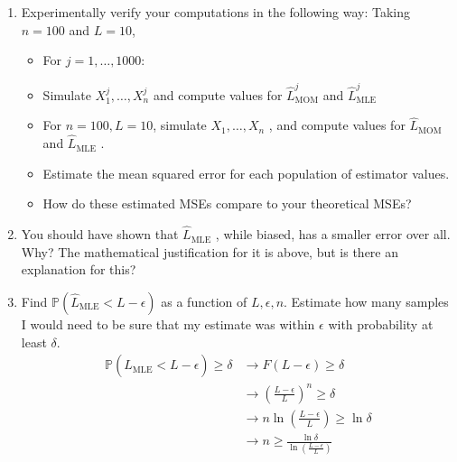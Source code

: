 \documentclass[letter, 12pt]{article}
\begin{document}
\begin{enumerate}[wide = 0pt, label = \arabic*)]
		\item {Experimentally verify your computations in the following way: Taking $ n = 100 $ and $ L = 10 $,}
		\begin{itemize}
			\item {For $ j = 1, \dots , 1000 $:}
			\item {Simulate $ X_1^j , \dots , X_n^j $ and compute values for $ \hat{L}_{\text{MOM}}^j $ and $ \hat{L}_{\text{MLE}}^j $}
			\item {For $ n = 100, L = 10 $, simulate $ X_1 , \dots , X_n $ , and compute values for $ \hat{L}_{\text{MOM}} $ and $ \hat{L}_{\text{MLE}} $ .}
			\item {Estimate the mean squared error for each population of estimator values.}
			\item {How do these estimated MSEs compare to your theoretical MSEs?}
		\end{itemize}
	
		\item {You should have shown that $ \hat{L}_{\text{MLE}} $ , while biased, has a smaller error over all. Why? The mathematical justification for it is above, but is there an explanation for this?}
		
		\item {Find $ \mathbb{P}(\hat{L}_{\text{MLE}} < L - \epsilon) $ as a function of $ L, \epsilon, n $. Estimate how many samples I would need to be sure that my estimate was within $ \epsilon $ with probability at least $ \delta $.}
		\begin{align*}
			\mathbb{P}(\hat{L}_{\text{MLE}} < L - \epsilon) \ge \delta &\rightarrow F(L - \epsilon) \ge \delta \\
			&\rightarrow (\frac{L - \epsilon}{L})^n \ge \delta \\
			&\rightarrow n \ln(\frac{L - \epsilon}{L}) \ge \ln\delta \\
			&\rightarrow n \ge \frac{\ln\delta}{\ln(\frac{L - \epsilon}{L})}
		\end{align*}
		

\end{enumerate}
\end{document}
